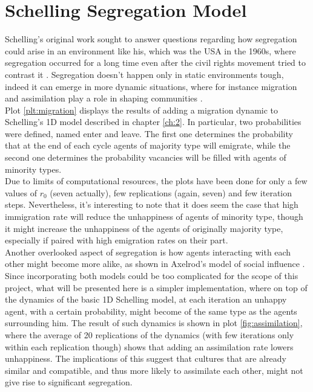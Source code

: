 \section{Schelling Segregation Model}\label{ch:app2}

Schelling's original work sought to answer questions regarding how segregation could arise in an environment like his, which was the USA in the 1960s, where segregation occurred for a long time even after the civil rights movement tried to contrast it \cite{sowell_knowledge_1996}. Segregation doesn't happen only in static environments tough, indeed it can emerge in more dynamic situations, where for instance migration and assimilation play a role in shaping communities \cite{sowell_social_2023}. \\
Plot \ref{plt:migration} displays the results of adding a migration dynamic to Schelling's 1D model described in chapter \ref{ch:2}. In particular, two probabilities were defined, named enter and leave. The first one determines the probability that at the end of each cycle agents of majority type will emigrate, while the second one determines the probability vacancies will be filled with agents of minority types. \\ 

Due to limits of computational resources, the plots have been done for only a few values of $r_0$ (seven actually), few replications (again, seven) and few iteration steps. Nevertheless, it's interesting to note that it does seem the case that high immigration rate will reduce the unhappiness of agents of minority type, though it might increase the unhappiness of the agents of originally majority type, especially if paired with high emigration rates on their part. \\

Another overlooked aspect of segregation is how agents interacting with each other might become more alike, as shown in Axelrod's model of social influence \cite{axelrod_dissemination_1997}. Since incorporating both models could be too complicated for the scope of this project, what will be presented here is a simpler implementation, where on top of the dynamics of the basic 1D Schelling model, at each iteration an unhappy agent, with a certain probability, might become of the same type as the agents surrounding him. The result of such dynamics is shown in plot \ref{fig:assimilation}, where the average of 20 replications of the dynamics (with few iterations only within each replication though) shows that adding an assimilation rate lowers unhappiness. The implications of this suggest that cultures that are already similar and compatible, and thus more likely to assimilate each other, might not give rise to significant segregation.


